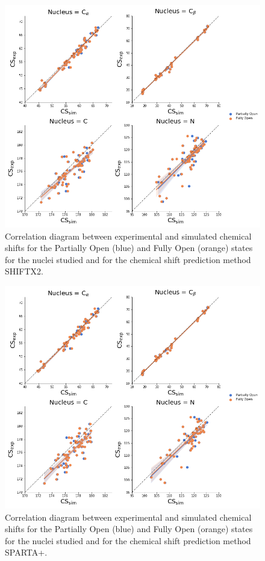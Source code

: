 \documentclass[%
 aip,
 amsmath,amssymb,
 preprint,%
]{revtex4-1}
\begin{document}
\begin{figure}[tbp]
	\includegraphics[width=\textwidth]{figures_SI/correlation_shiftx2_print.png}
	 \caption{\scriptsize
 Correlation diagram between experimental and simulated chemical shifts for the Partially Open (blue) and Fully Open (orange) states for the nuclei studied and for the chemical shift prediction method SHIFTX2. 
}
\label{SI_corr1}
\end{figure}

\begin{figure}[tbp]
	\includegraphics[width=\textwidth]{figures_SI/correlation_sparta_plus_print.png}
	 \caption{\scriptsize
 Correlation diagram between experimental and simulated chemical shifts for the Partially Open (blue) and Fully Open (orange) states for the nuclei studied and for the chemical shift prediction method SPARTA+. 
}
\label{SI_corr2}
\end{figure}
\end{document}
